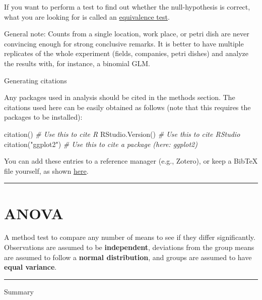 \documentclass[
]{book}
\newenvironment{Shaded}{\begin{snugshade}}{\end{snugshade}}
\newcommand{\CommentTok}[1]{\textcolor[rgb]{0.56,0.35,0.01}{\textit{#1}}}
\newcommand{\FunctionTok}[1]{\textcolor[rgb]{0.00,0.00,0.00}{#1}}
\newcommand{\NormalTok}[1]{#1}
\newcommand{\StringTok}[1]{\textcolor[rgb]{0.31,0.60,0.02}{#1}}
\begin{document}
If you want to perform a test to find out whether the null-hypothesis is correct, what you are looking for is called an \href{https://en.wikipedia.org/wiki/Equivalence_test}{equivalence test}.

General note: Counts from a single location, work place, or petri dish are never convincing enough for strong conclusive remarks. It is better to have multiple replicates of the whole experiment (fields, companies, petri dishes) and analyze the results with, for instance, a binomial GLM.

Generating citations

Any packages used in analysis should be cited in the methods section. The citations used here can be easily obtained as follows (note that this requires the packages to be installed):

\begin{Shaded}
\begin{Highlighting}[]
\FunctionTok{citation}\NormalTok{()          }\CommentTok{\# Use this to cite R}
\FunctionTok{RStudio.Version}\NormalTok{()   }\CommentTok{\# Use this to cite RStudio}
\FunctionTok{citation}\NormalTok{(}\StringTok{"ggplot2"}\NormalTok{) }\CommentTok{\# Use this to cite a package (here: ggplot2)}
\end{Highlighting}
\end{Shaded}

You can add these entries to a reference manager (e.g., Zotero), or keep a BibTeX file yourself, as shown \href{https://youtu.be/zuuOYjE8m98}{here}.

\begin{center}\rule{0.5\linewidth}{0.5pt}\end{center}

\hypertarget{anova}{%
\chapter{ANOVA}\label{anova}}

A method test to compare any number of means to see if they differ significantly. Observations are assumed to be \textbf{independent}, deviations from the group means are assumed to follow a \textbf{normal distribution}, and groups are assumed to have \textbf{equal variance}.

\begin{center}\rule{0.5\linewidth}{0.5pt}\end{center}

Summary
\end{document}
